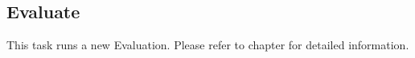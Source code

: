 \subsection{Evaluate}
\label{sec:ui_proc_evaluate}

This task runs a new Evaluation. Please refer to chapter  for detailed information.
